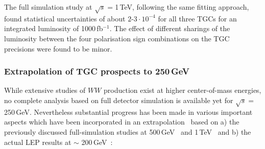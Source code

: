 The full simulation study at $\sqrt{s}=$1\,TeV, following the same fitting approach, found statistical uncertainties of about $2$-$3 \cdot 10^{-4}$ for all three TGCs for an integrated luminosity of 1000\,fb$^{-1}$. The effect of different sharings of the luminosity between the four polarisation sign combinations on the TGC precisions were found to be minor. 

\subsubsection{Extrapolation of TGC prospects to 250\,GeV}

While extensive studies of $WW$ production exist at higher center-of-mass energies, no complete analysis based on full detector simulation is available yet for $\sqrt{s}=$250\,GeV. Nevertheless substantial progress has been made in various important aspects which have been incorporated in
an extrapolation~\cite{Fujii:2017vwa} based on a) the previously discussed full-simulation studies at 500\,GeV~\cite{Marchesini:94888} and 1\,TeV~\cite{Rosca:2016hcq} and b) the actual LEP results at $\sim$ 200\,GeV~\cite{Schael:2004tq}:
